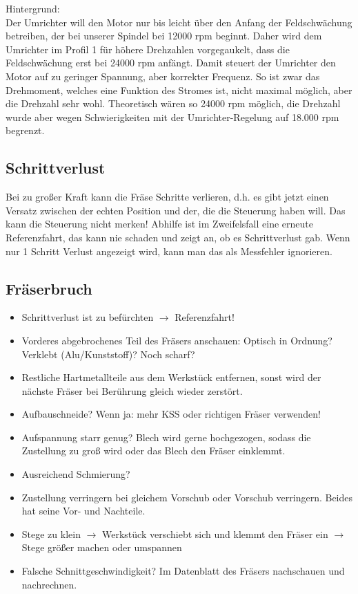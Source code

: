 \documentclass{\basedir/fablab-document}
\begin{document}
Hintergrund:\\
Der Umrichter will den Motor nur bis leicht über den Anfang der Feldschwächung betreiben, der bei unserer Spindel bei 12000 rpm beginnt. Daher wird dem Umrichter im Profil 1 für höhere Drehzahlen vorgegaukelt, dass die Feldschwächung erst bei 24000 rpm anfängt. Damit steuert der Umrichter den Motor auf zu geringer Spannung, aber korrekter Frequenz. So ist zwar das Drehmoment, welches eine Funktion des Stromes ist, nicht maximal möglich, aber die Drehzahl sehr wohl. Theoretisch wären so 24000 rpm möglich, die Drehzahl wurde aber wegen Schwierigkeiten mit der Umrichter-Regelung auf 18.000 rpm begrenzt.

\subsection{Schrittverlust}
Bei zu großer Kraft kann die Fräse Schritte verlieren, d.h. es gibt jetzt einen Versatz zwischen der echten Position und der, die die Steuerung haben will. Das kann die Steuerung nicht merken! Abhilfe ist im Zweifelsfall eine erneute Referenzfahrt, das kann nie schaden und zeigt an, ob es Schrittverlust gab. Wenn nur 1 Schritt Verlust angezeigt wird, kann man das als Messfehler ignorieren.

\subsection{Fräserbruch}
\begin{itemize}
 \item Schrittverlust ist zu befürchten $\rightarrow$ Referenzfahrt!
 \item Vorderes abgebrochenes Teil des Fräsers anschauen: Optisch in Ordnung? Verklebt (Alu/Kunststoff)? Noch scharf?
 \item Restliche Hartmetallteile aus dem Werkstück entfernen, sonst wird der nächste Fräser bei Berührung gleich wieder zerstört.
 \item Aufbauschneide? Wenn ja: mehr KSS oder richtigen Fräser verwenden!
 \item Aufspannung starr genug? Blech wird gerne hochgezogen, sodass die Zustellung zu groß wird oder das Blech den Fräser einklemmt.
 \item Ausreichend Schmierung?
 \item Zustellung verringern bei gleichem Vorschub oder Vorschub verringern. Beides hat seine Vor- und Nachteile.
 \item Stege zu klein $\rightarrow$ Werkstück verschiebt sich und klemmt den Fräser ein $\rightarrow$ Stege größer machen oder umspannen
 \item Falsche Schnittgeschwindigkeit? Im Datenblatt des Fräsers nachschauen und nachrechnen.
 \end{itemize}
\end{document}
